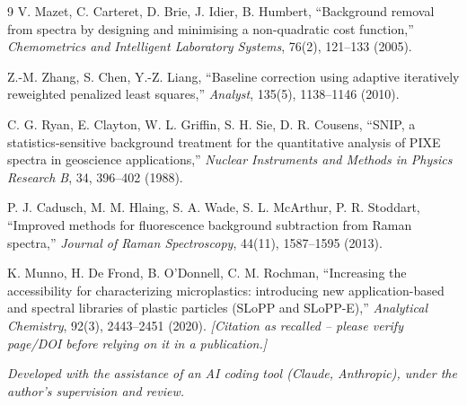\documentclass[11pt,a4paper]{article}
\begin{document}
\begin{thebibliography}{9}
V. Mazet, C. Carteret, D. Brie, J. Idier, B. Humbert, ``Background removal
from spectra by designing and minimising a non-quadratic cost function,''
\emph{Chemometrics and Intelligent Laboratory Systems}, 76(2), 121--133
(2005).

Z.-M. Zhang, S. Chen, Y.-Z. Liang, ``Baseline correction using adaptive
iteratively reweighted penalized least squares,'' \emph{Analyst}, 135(5),
1138--1146 (2010).

C. G. Ryan, E. Clayton, W. L. Griffin, S. H. Sie, D. R. Cousens, ``SNIP, a
statistics-sensitive background treatment for the quantitative analysis of
PIXE spectra in geoscience applications,'' \emph{Nuclear Instruments and
Methods in Physics Research B}, 34, 396--402 (1988).

P. J. Cadusch, M. M. Hlaing, S. A. Wade, S. L. McArthur, P. R. Stoddart,
``Improved methods for fluorescence background subtraction from Raman
spectra,'' \emph{Journal of Raman Spectroscopy}, 44(11), 1587--1595 (2013).

K. Munno, H. De Frond, B. O'Donnell, C. M. Rochman, ``Increasing the
accessibility for characterizing microplastics: introducing new
application-based and spectral libraries of plastic particles (SLoPP and
SLoPP-E),'' \emph{Analytical Chemistry}, 92(3), 2443--2451 (2020).
\emph{[Citation as recalled -- please verify page/DOI before relying on
it in a publication.]}

\end{thebibliography}

\vspace{1cm}
\noindent\textit{Developed with the assistance of an AI coding tool (Claude,
Anthropic), under the author's supervision and review.}
\end{document}
